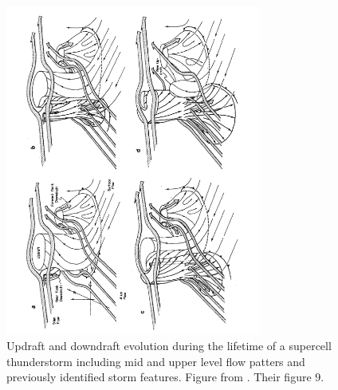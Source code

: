 \begin{figure}[h!]
    \centering
    \includegraphics[width=0.75\textwidth, angle = 270]{figures/supercell_evolution.png}
    \caption{Updraft and downdraft evolution during the lifetime of a supercell thunderstorm including mid and upper level flow patters and previously identified storm features. Figure from \cite{lemon1979severe}. Their figure 9.}
    \label{fig:supevolution}
\end{figure}
